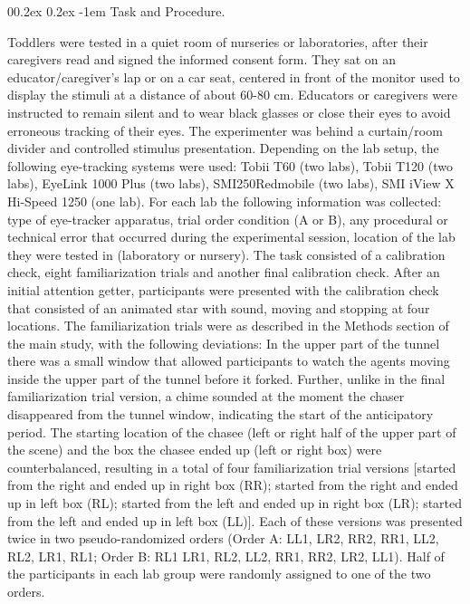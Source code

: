 \documentclass[
  man, donotrepeattitle,floatsintext]{apa6}
\makeatletter
\let\oldparagraph\paragraph
\renewcommand{\paragraph}{
    \@ifstar
      \xxxParagraphStar
      \xxxParagraphNoStar
  }
\newcommand{\xxxParagraphStar}[1]{\oldparagraph*{#1}\mbox{}}
\newcommand{\xxxParagraphNoStar}[1]{\oldparagraph{#1}\mbox{}}
\renewcommand{\paragraph}{\@startsection{paragraph}{4}{\parindent}%
  {0\baselineskip \@plus 0.2ex \@minus 0.2ex}%
  {-1em}%
  {\normalfont\normalsize\bfseries\itshape\typesectitle}}
\makeatother
\begin{document}
\paragraph{Task and Procedure.}\label{task-and-procedure.}

Toddlers were tested in a quiet room of nurseries or laboratories, after their caregivers read and signed the informed consent form. They sat on an educator/caregiver's lap or on a car seat, centered in front of the monitor used to display the stimuli at a distance of about 60-80 cm. Educators or caregivers were instructed to remain silent and to wear black glasses or close their eyes to avoid erroneous tracking of their eyes. The experimenter was behind a curtain/room divider and controlled stimulus presentation. Depending on the lab setup, the following eye-tracking systems were used: Tobii T60 (two labs), Tobii T120 (two labs), EyeLink 1000 Plus (two labs), SMI250Redmobile (two labs), SMI iView X Hi-Speed 1250 (one lab). For each lab the following information was collected: type of eye-tracker apparatus, trial order condition (A or B), any procedural or technical error that occurred during the experimental session, location of the lab they were tested in (laboratory or nursery).
The task consisted of a calibration check, eight familiarization trials and another final calibration check. After an initial attention getter, participants were presented with the calibration check that consisted of an animated star with sound, moving and stopping at four locations. The familiarization trials were as described in the Methods section of the main study, with the following deviations: In the upper part of the tunnel there was a small window that allowed participants to watch the agents moving inside the upper part of the tunnel before it forked. Further, unlike in the final familiarization trial version, a chime sounded at the moment the chaser disappeared from the tunnel window, indicating the start of the anticipatory period. The starting location of the chasee (left or right half of the upper part of the scene) and the box the chasee ended up (left or right box) were counterbalanced, resulting in a total of four familiarization trial versions {[}started from the right and ended up in right box (RR); started from the right and ended up in left box (RL); started from the left and ended up in right box (LR); started from the left and ended up in left box (LL){]}. Each of these versions was presented twice in two pseudo-randomized orders (Order A: LL1, LR2, RR2, RR1, LL2, RL2, LR1, RL1; Order B: RL1 LR1, RL2, LL2, RR1, RR2, LR2, LL1). Half of the participants in each lab group were randomly assigned to one of the two orders.
\end{document}
